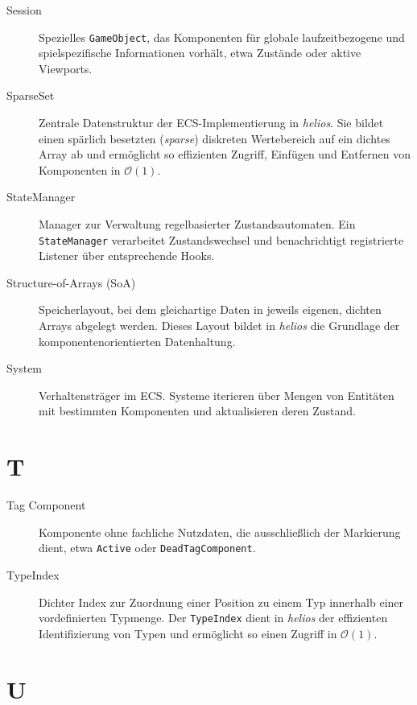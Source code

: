 \begin{description}
    \item[Session] Spezielles \texttt{GameObject}, das Komponenten für globale laufzeitbezogene und spielspezifische Informationen vorhält, etwa Zustände oder aktive Viewports.

    \item[SparseSet] Zentrale Datenstruktur der ECS-Implementierung in \textit{helios}.
    Sie bildet einen spärlich besetzten (\textit{sparse}) diskreten Wertebereich auf ein dichtes Array ab und ermöglicht so effizienten Zugriff, Einfügen und Entfernen von Komponenten in $\mathcal{O}(1)$.

    \item[StateManager] Manager zur Verwaltung regelbasierter Zustandsautomaten.
    Ein \texttt{StateManager} verarbeitet Zustandswechsel und benachrichtigt registrierte Listener über entsprechende Hooks.

    \item[Structure-of-Arrays (SoA)] Speicherlayout, bei dem gleichartige Daten in jeweils eigenen, dichten Arrays abgelegt werden.
    Dieses Layout bildet in \textit{helios} die Grundlage der komponentenorientierten Datenhaltung.

    \item[System] Verhaltensträger im ECS.
    Systeme iterieren über Mengen von Entitäten mit bestimmten Komponenten und aktualisieren deren Zustand.
\end{description}

\section*{T}

\begin{description}
    \item[Tag Component] Komponente ohne fachliche Nutzdaten, die ausschließlich der Markierung dient, etwa \texttt{Active} oder \texttt{DeadTagComponent}.

    \item[TypeIndex] Dichter Index zur Zuordnung einer Position zu einem Typ innerhalb einer vordefinierten Typmenge.
    Der \texttt{TypeIndex} dient in \textit{helios} der effizienten Identifizierung von Typen und ermöglicht so einen Zugriff in $\mathcal{O}(1)$.
\end{description}

\section*{U}

